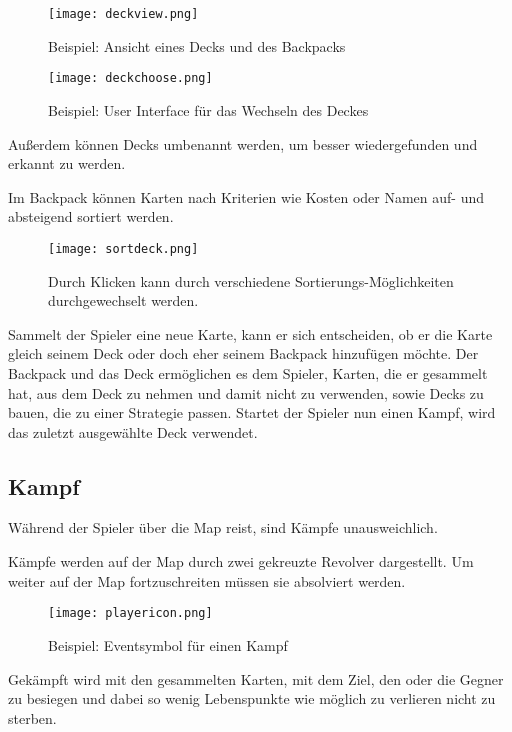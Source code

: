 \begin{figure}[H]
    \texttt{[image: deckview.png]}
    \caption{Beispiel: Ansicht eines Decks und des Backpacks}
\end{figure}

\begin{figure}[H]
    \texttt{[image: deckchoose.png]}
    \caption{Beispiel: User Interface für das Wechseln des Deckes}
\end{figure}


Außerdem können Decks umbenannt werden, um besser wiedergefunden und erkannt zu werden.

Im Backpack können Karten nach Kriterien wie Kosten oder Namen auf- und absteigend sortiert werden.

\begin{figure}[H]
    \texttt{[image: sortdeck.png]}
    \caption{Durch Klicken kann durch verschiedene Sortierungs-Möglichkeiten durchgewechselt werden.}
\end{figure}

Sammelt der Spieler eine neue Karte, kann er sich entscheiden, ob er die Karte gleich seinem Deck oder doch eher seinem
Backpack hinzufügen möchte.
Der Backpack und das Deck ermöglichen es dem Spieler, Karten, die er gesammelt hat, aus dem Deck zu nehmen und damit
nicht zu verwenden, sowie Decks zu bauen, die zu einer Strategie passen.
Startet der Spieler nun einen Kampf, wird das zuletzt ausgewählte Deck verwendet.


\subsection{Kampf}\label{backpack_and_deck}

Während der Spieler über die Map reist, sind Kämpfe unausweichlich.


Kämpfe werden auf der Map durch zwei gekreuzte Revolver dargestellt. Um weiter auf der Map fortzuschreiten müssen sie absolviert werden.

\begin{figure}[H]
    \centering
    \texttt{[image: playericon.png]}
    \caption{Beispiel: Eventsymbol für einen Kampf}
\end{figure}

Gekämpft wird mit den gesammelten Karten, mit dem Ziel, den oder die Gegner zu besiegen und dabei so wenig Lebenspunkte
wie möglich zu verlieren \bzw nicht zu sterben.


